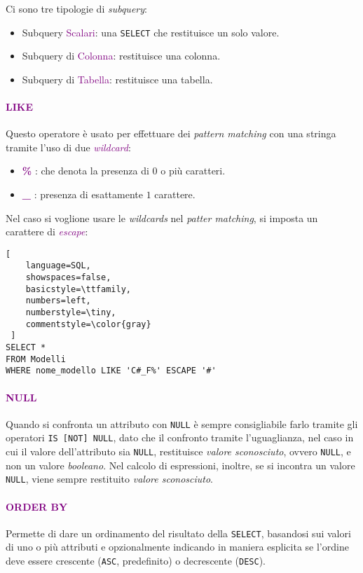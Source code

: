 Ci sono tre tipologie di \emph{subquery}:
\begin{itemize}
    \item Subquery \textcolor{purple}{Scalari}: una \verb|SELECT| che restituisce un solo valore.
    \item Subquery di \textcolor{purple}{Colonna}: restituisce una colonna.
    \item Subquery di \textcolor{purple}{Tabella}: restituisce una tabella.
\end{itemize}

\paragraph{\textcolor{purple}{LIKE}} Questo operatore è usato per effettuare dei \emph{pattern matching} con una stringa
tramite l'uso di due \emph{\textcolor{purple}{wildcard}}:
\begin{itemize}
    \item \textbf{\textcolor{purple}{\%}} : che denota la presenza di $0$ o più caratteri.
    \item \textbf{\textcolor{purple}{\_}} : presenza di esattamente $1$ carattere.
\end{itemize}

Nel caso si voglione usare le \emph{wildcards} nel \emph{patter matching}, si imposta un carattere di \emph{\textcolor{purple}{escape}}:
\begin{lstlisting}[
    language=SQL,
    showspaces=false,
    basicstyle=\ttfamily,
    numbers=left,
    numberstyle=\tiny,
    commentstyle=\color{gray}
 ]
SELECT *
FROM Modelli
WHERE nome_modello LIKE 'C#_F%' ESCAPE '#'
\end{lstlisting}

\paragraph{\textcolor{purple}{NULL}} Quando si confronta un attributo
con \verb|NULL| è sempre consigliabile farlo tramite gli operatori \verb|IS [NOT] NULL|, dato che
il confronto tramite l'uguaglianza, nel caso in cui il valore dell'attributo sia \verb|NULL|, restituisce \emph{valore sconosciuto},
ovvero \verb|NULL|, e non un valore \emph{booleano}.
Nel calcolo di espressioni, inoltre, se si incontra
un valore \verb|NULL|, viene sempre restituito \emph{valore sconosciuto}.

\paragraph{\textcolor{purple}{ORDER BY}} Permette di dare un ordinamento
del risultato della \verb|SELECT|, basandosi sui valori di uno o più attributi e opzionalmente
indicando in maniera esplicita se l'ordine deve essere crescente (\verb|ASC|, predefinito) o decrescente
(\verb|DESC|).

